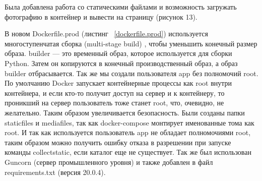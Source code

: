 Была добавлена работа со статическими файлами и возможность загружать фотографию в контейнер и вывести на страницу (рисунок 13).

В новом \textsf{Dockerfile.prod} (листинг ~\ref{dockerfile.prod}) используется многоступенчатая сборка (\textsf{multi-stage build}) , чтобы уменьшить конечный размер образа. \textsf{builder} — это временный образ, которое используется для сборки \textsf{Python}. Затем он копируются в конечный производственный образ, а образ \textsf{builder} отбрасывается. Так же мы создали пользователя app без полномочий \textsf{root}. По умолчанию \textsf{Docker} запускает контейнерные процессы как \textsf{root} внутри контейнера, и если кто-то получит доступ на сервер и к контейнеру, то проникший на сервер пользователь тоже станет \textsf{root}, что, очевидно, не желательно. Таким образом увеличивается безопасность. Были созданы папки \textsf{staticfiles} и \textsf{mediafiles}, так как \textsf{docker-compose} монтирует именованные тома как \textsf{root}. И так как используется пользователь \textsf{app} не обладает полномочиями \textsf{root}, таким образом можно получить ошибку отказа в разрешении при запуске команды \textsf{collectstatic}, если каталог еще не существует.
	Так же был использован \textsf{Guncorn} (сервер промышленного уровня) и также добавлен в файл \textsf{requirements.txt} (версия \textsf{20.0.4}).

